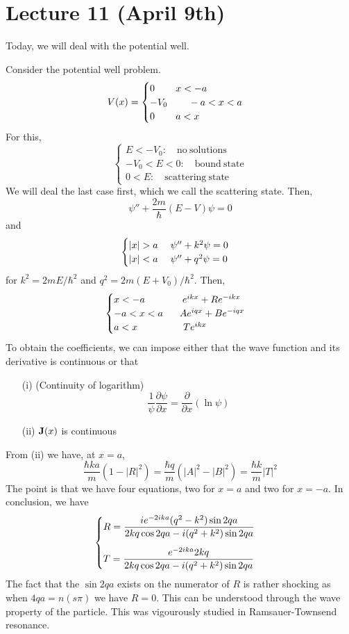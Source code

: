 \section{Lecture 11 (April 9th)}
Today, we will deal with the potential well.
\\
\begin{thm}
Consider the potential well problem. 
\[V(x)=
\begin{cases}
0\hspace{5ex}x< -a\\
-V_0\hspace{5ex}-a<x<a\\
0\hspace{5ex}a<x
\end{cases}\]
For this,
\[\begin{cases}
E<-V_{0}:\quad\mathrm{no\ solutions}\\
-V_0<E<0:\quad\mathrm{bound\ state}\\
0<E:\quad\mathrm{scattering\ state}
\end{cases}\]
We will deal the last case first, which we call the scattering state. Then,
\[\psi ''+\dfrac{2m}{\hbar }(E-V)\psi =0\]
and 
\[\begin{cases}
|x|>a\hspace{3ex}\psi ''+k^2\psi =0\\
|x|<a\hspace{3ex}\psi ''+q^2\psi =0
\end{cases}\]
for $k^2=2mE/\hbar ^2$ and $q^2=2m(E+V_0)/\hbar ^2$. Then, 
\[\begin{cases}
x<-a\hspace{9ex}e^{ikx}+Re^{-ikx}\\
-a<x<a\hspace{4ex}Ae^{iqx}+Be^{-iqx}\\
a<x\hspace{11ex}Te^{ikx}
\end{cases}\]
To obtain the coefficients, we can impose either that the wave function and its derivative is continuous or that
\begin{itemize}
\item[(i)] (Continuity of logarithm)\[\dfrac{1}{\psi }\dfrac{\partial \psi }{\partial x}=\dfrac{\partial }{\partial x}(\ln \psi )  \]
\item[(ii)] ${\bf J}(x)$ is continuous
\end{itemize}
From (ii) we have, at $x=a$,
\[\dfrac{\hbar ka}{m}(1-|R|^2)=\dfrac{\hbar q}{m}(|A|^2-|B|^2)=\dfrac{\hbar k}{m}|T|^2\]
The point is that we have four equations, two for $x=a$ and two for $x=-a$. In conclusion, we have
\[\begin{cases}
\vspace{2ex}
R=\dfrac{ie^{-2ika}(q^2-k^2)\sin 2qa}{2kq\cos 2qa-i(q^2+k^2)\sin 2qa}\\
T=\dfrac{e^{-2ika}2kq}{2kq\cos 2qa-i(q^2+k^2)\sin 2qa}
\end{cases}\]
The fact that the $\sin 2qa$ exists on the numerator of $R$ is rather shocking as when $4qa=n(s\pi )$ we have $R=0$. This can be understood through the wave property of the particle. This was vigourously studied in Ramsauer-Townsend resonance.
\end{thm}
